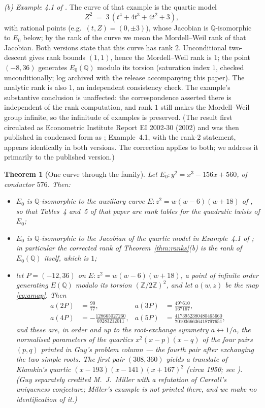 \documentclass[11pt]{amsart}
\newtheorem{theorem}{Theorem}[section]
\newcommand{\Q}{\mathbb{Q}}
\newcommand{\Z}{\mathbb{Z}}
\begin{document}
\emph{(b) Example 4.1 of \cite{Stroeker2006}.}  The curve of that
example is the quartic model
\[
Z^2 \;=\; 3\,(t^4+4t^3+4t^2+3),
\]
with rational points (e.g.\ $(t,Z)=(0,\pm 3)$), whose Jacobian is
$\Q$-isomorphic to $E_0$ below; by the rank of the curve we mean the
Mordell--Weil rank of that Jacobian.  Both versions state that this
curve has rank $2$.  Unconditional two-descent gives rank bounds
$(1,1)$, hence the Mordell--Weil rank is $1$; the point $(-8,36)$
generates $E_0(\Q)$ modulo its torsion (saturation index $1$, checked
unconditionally; log archived with the release accompanying this
paper).  The analytic rank is also
$1$, an independent consistency check.  The example's substantive
conclusion is unaffected: the correspondence asserted there is
independent of the rank computation, and rank $1$ still makes the
Mordell--Weil group infinite, so the infinitude of examples is
preserved.  (The result first circulated as Econometric Institute
Report EI 2002-30 (2002) and was then published in condensed form as
\cite{Stroeker2006}; Example~4.1, with the rank-$2$ statement, appears
identically in both versions.  The correction applies to both; we
address it primarily to the published version.)

\begin{theorem}[One curve through the family]\label{thm:curve}
Let $E_0\colon y^2=x^3-156x+560$, of conductor $576$.  Then:
\begin{itemize}
\item[(a)] $E_0$ is $\Q$-isomorphic to the auxiliary curve
$E\colon z^2=w(w-6)(w+18)$ of \cite{BM2000}, so that Tables~4 and~5 of
that paper are rank tables for the quadratic twists of $E_0$;
\item[(b)] $E_0$ is $\Q$-isomorphic to the Jacobian of the quartic
model in Example~4.1 of \cite{Stroeker2006}; in particular the
corrected rank of Theorem~\ref{thm:ranks}(b) is the rank of $E_0(\Q)$
itself, which is $1$;
\item[(c)] let $P=(-12,36)$ on $E\colon z^2=w(w-6)(w+18)$, a point of
infinite order generating $E(\Q)$ modulo its torsion $(\Z/2\Z)^2$, and
let $a(w,z)$ be the map \eqref{eq:amap}.  Then
\[
\begin{aligned}
a(2P)&=\frac{90}{77}, &
a(3P)&=\frac{497610}{167167},\\[2pt]
a(4P)&=-\frac{128665027260}{69283212011}, &
a(5P)&=\frac{4173952380480465660}{7010366636418797651},
\end{aligned}
\]
and these are, in order and up to the root-exchange symmetry
$a\leftrightarrow 1/a$, the normalised parameters of the quartics
$x^2(x-p)(x-q)$ of the \emph{four} pairs $(p,q)$ printed in Guy's
problem column \cite{Guy1989} --- the fourth pair after exchanging the
two simple roots.  The first pair $(308,360)$ yields a translate of
Klamkin's quartic $(x-193)(x-141)(x+167)^2$ (circa 1950; see
\cite{Carroll1989}).  (Guy separately credited M.~J.~Miller with a
refutation of Carroll's uniqueness conjecture; Miller's example is not
printed there, and we make no identification of it.)
\end{itemize}
\end{theorem}
\end{document}
